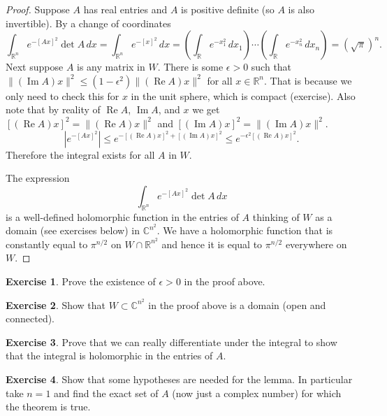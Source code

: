 \documentclass[12pt,openany]{book}
\renewcommand{\Re}{\operatorname{Re}}
\renewcommand{\Im}{\operatorname{Im}}
\newcommand{\snorm}[1]{\lVert {#1} \rVert}
\newcommand{\abs}[1]{\left\lvert {#1} \right\rvert}
\newcommand{\C}{{\mathbb{C}}}
\newcommand{\R}{{\mathbb{R}}}
\theoremstyle{plain}
\theoremstyle{remark}
\theoremstyle{definition}
\newenvironment{exbox}{%
    \def\FrameCommand{\vrule width 1pt \relax\hspace {10pt}}%
    \MakeFramed {\advance \hsize -\width \FrameRestore }%
}{%
    \endMakeFramed
}
\theoremstyle{exercise}
\newtheorem{exercise}{Exercise}[section]
\theoremstyle{example}
\begin{document}
\begin{proof}
Suppose $A$ has real entries and $A$ is positive definite (so
$A$ is also invertible).  By a
change of coordinates
\begin{equation*}
\int_{\R^n} e^{-{[Ax]}^2} \det A \, dx  =
\int_{\R^n} e^{-{[x]}^2} \, dx  =
\left(\int_\R e^{-x_1^2} \, dx_1 \right)
\cdots
\left(\int_\R e^{-x_n^2} \, dx_n \right)
=
{(\sqrt{\pi})}^n .
\end{equation*}
Next suppose $A$ is any matrix in $W$.
There is some $\epsilon > 0$
such that $\snorm{(\Im A) x}^2 \leq
(1-\epsilon^2) \snorm{(\Re A) x}^2$ for all $x \in \R^n$.  That is because
we only need to check this for $x$ in the unit sphere, which is compact
(exercise).  Also note that by reality of $\Re A$, $\Im A$, and $x$
we get 
${[(\Re A)x]}^2 = \snorm{(\Re A)x}^2$ and
${[(\Im A)x]}^2 = \snorm{(\Im A)x}^2$.
\begin{equation*}
\abs{e^{-{[Ax]}^2}}
\leq
e^{-{[(\Re A)x]}^2 + {[(\Im A)x]}^2}
\leq
e^{-\epsilon^2 {[(\Re A)x]}^2} .
\end{equation*}
Therefore the integral exists for all $A$ in $W$.

The expression
\begin{equation*}
\int_{\R^n} e^{-{[Ax]}^2} \det A \, dx
\end{equation*}
is a well-defined holomorphic function in the entries of $A$ thinking of
$W$ as a domain (see exercises below) in $\C^{n^2}$.  We have a holomorphic function that is
constantly equal to $\pi^{n/2}$ on $W \cap \R^{n^2}$ and hence it is equal
to $\pi^{n/2}$ everywhere on $W$.
\end{proof}

\begin{exbox}
\begin{exercise}
Prove the existence of $\epsilon > 0$ in the proof above. 
\end{exercise}

\begin{exercise}
Show that $W \subset \C^{n^2}$ in the proof above is a domain (open and connected).
\end{exercise}

\begin{exercise}
Prove that we can really differentiate under the integral to show that the
integral is holomorphic in the entries of $A$.
\end{exercise}

\begin{exercise}
Show that some hypotheses are needed for the lemma.  In particular take
$n=1$ and find the exact set of $A$ (now just a complex number) for which
the theorem is true.
\end{exercise}
\end{exbox}
\end{document}
